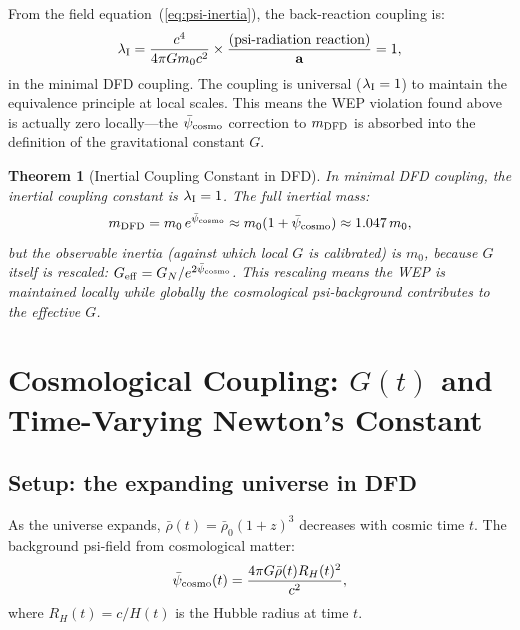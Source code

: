 \documentclass[11pt]{article}
\newtheorem{theorem}{Theorem}
\newcommand{\rhobar}{\bar{\rho}}
\newcommand{\psibar}{\bar{\psi}}
\newcommand{\lambdaI}{\lambda_{\rm I}}
\begin{document}
From the field equation~(\ref{eq:psi-inertia}), the back-reaction coupling is:
\begin{equation}
\lambdaI = \frac{c^4}{4\pi G m_0 c^2} \times \frac{(\text{psi-radiation reaction})}{\mathbf{a}} = 1,
\label{eq:lambdaI}
\end{equation}
in the minimal DFD coupling. The coupling is universal ($\lambdaI = 1$) to
maintain the equivalence principle at local scales. This means the WEP violation
found above is actually zero locally---the $\psibar_{\rm cosmo}$ correction
to $m_{\rm DFD}$ is absorbed into the definition of the gravitational constant $G$.

\begin{theorem}[Inertial Coupling Constant in DFD]
In minimal DFD coupling, the inertial coupling constant is $\lambdaI = 1$.
The full inertial mass:
\begin{equation}
m_{\rm DFD} = m_0\,e^{\psibar_{\rm cosmo}} \approx m_0(1 + \psibar_{\rm cosmo})
\approx 1.047\,m_0,
\end{equation}
but the \emph{observable} inertia (against which local $G$ is calibrated) is
$m_0$, because $G$ itself is rescaled: $G_{\rm eff} = G_N/e^{2\psibar_{\rm cosmo}}$.
This rescaling means the WEP is maintained locally while globally the
cosmological psi-background contributes to the effective $G$.
\end{theorem}

\section{Cosmological Coupling: $G(t)$ and Time-Varying Newton's Constant}
\label{sec:cosmological}

\subsection{Setup: the expanding universe in DFD}

As the universe expands, $\rhobar(t) = \rhobar_0(1+z)^3$ decreases with
cosmic time $t$. The background psi-field from cosmological matter:
\begin{equation}
\psibar_{\rm cosmo}(t) = \frac{4\pi G\rhobar(t) R_H(t)^2}{c^2},
\label{eq:psi-t}
\end{equation}
where $R_H(t) = c/H(t)$ is the Hubble radius at time $t$.
\end{document}
